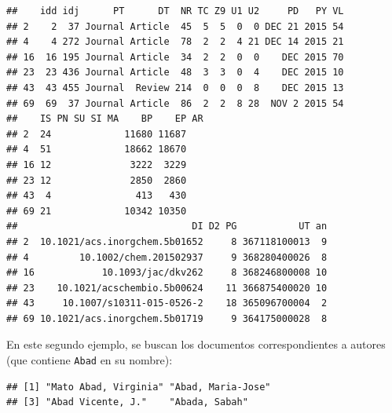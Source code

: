 \documentclass[
]{book}
\newenvironment{Shaded}{\begin{snugshade}}{\end{snugshade}}
\newcommand{\CommentTok}[1]{\textcolor[rgb]{0.56,0.35,0.01}{\textit{#1}}}
\newcommand{\FunctionTok}[1]{\textcolor[rgb]{0.13,0.29,0.53}{\textbf{#1}}}
\newcommand{\NormalTok}[1]{#1}
\newcommand{\OtherTok}[1]{\textcolor[rgb]{0.56,0.35,0.01}{#1}}
\newcommand{\SpecialCharTok}[1]{\textcolor[rgb]{0.81,0.36,0.00}{\textbf{#1}}}
\newcommand{\StringTok}[1]{\textcolor[rgb]{0.31,0.60,0.02}{#1}}
\begin{document}
\begin{verbatim}
##    idd idj      PT      DT  NR TC Z9 U1 U2     PD   PY VL
## 2    2  37 Journal Article  45  5  5  0  0 DEC 21 2015 54
## 4    4 272 Journal Article  78  2  2  4 21 DEC 14 2015 21
## 16  16 195 Journal Article  34  2  2  0  0    DEC 2015 70
## 23  23 436 Journal Article  48  3  3  0  4    DEC 2015 10
## 43  43 455 Journal  Review 214  0  0  0  8    DEC 2015 13
## 69  69  37 Journal Article  86  2  2  8 28  NOV 2 2015 54
##    IS PN SU SI MA    BP    EP AR
## 2  24             11680 11687   
## 4  51             18662 18670   
## 16 12              3222  3229   
## 23 12              2850  2860   
## 43  4               413   430   
## 69 21             10342 10350   
##                               DI D2 PG           UT an
## 2  10.1021/acs.inorgchem.5b01652     8 367118100013  9
## 4         10.1002/chem.201502937     9 368280400026  8
## 16            10.1093/jac/dkv262     8 368246800008 10
## 23    10.1021/acschembio.5b00624    11 366875400020 10
## 43     10.1007/s10311-015-0526-2    18 365096700004  2
## 69 10.1021/acs.inorgchem.5b01719     9 364175000028  8
\end{verbatim}

En este segundo ejemplo, se buscan los documentos correspondientes a autores (que contiene \texttt{Abad} en su nombre):

\begin{Shaded}
\end{Shaded}

\begin{verbatim}
## [1] "Mato Abad, Virginia" "Abad, Maria-Jose"   
## [3] "Abad Vicente, J."    "Abada, Sabah"
\end{verbatim}

\begin{Shaded}
\end{Shaded}
\end{document}
